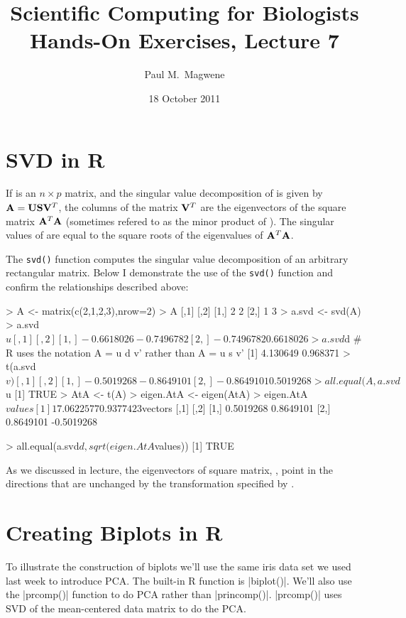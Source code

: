 \documentclass[11pt,letterpaper]{article}
\author{Paul M.~Magwene}
\title{
Scientific Computing for Biologists\\
Hands-On Exercises, Lecture 7}
\date{18 October 2011}
\begin{document}
\maketitle


\section*{ SVD in R}


If  is an $n \times p$ matrix, and the singular value decomposition of  is given by $\mathbf{A} = \mathbf{U} \mathbf{S} \mathbf{V}^T$, the columns of the  matrix $\mathbf{V}^T$ are the eigenvectors of the square matrix $\mathbf{A}^T \mathbf{A}$ (sometimes refered to  as the minor product of ). The singular values of  are equal to the square roots of the eigenvalues of $\mathbf{A}^T \mathbf{A}$. 

The \texttt{svd()} function computes the singular value decomposition of an arbitrary rectangular matrix. Below I demonstrate the use of the \texttt{svd()} function and confirm the relationships described above:


\begin{Rcode}
> A <- matrix(c(2,1,2,3),nrow=2)
> A
     [,1] [,2]
[1,]    2    2
[2,]    1    3
> a.svd <- svd(A)
> a.svd$u
           [,1]       [,2]
[1,] -0.6618026 -0.7496782
[2,] -0.7496782  0.6618026
> a.svd$d	  # R uses the notation A = u d v' rather than A = u s v' 
[1] 4.130649 0.968371
> t(a.svd$v)
           [,1]       [,2]
[1,] -0.5019268 -0.8649101
[2,] -0.8649101  0.5019268
> all.equal(A, a.svd$u %
[1] TRUE
> AtA <- t(A) %
> eigen.AtA <- eigen(AtA)
> eigen.AtA
$values
[1] 17.0622577  0.9377423

$vectors
          [,1]       [,2]
[1,] 0.5019268  0.8649101
[2,] 0.8649101 -0.5019268

> all.equal(a.svd$d, sqrt(eigen.AtA$values))
[1] TRUE
\end{Rcode}

As we discussed in lecture, the eigenvectors of square matrix, , point in the directions that are unchanged by the transformation specified by .



\section*{Creating Biplots in R}

To illustrate the construction of biplots we'll use the same iris data set we used last week to introduce PCA. The built-in R function is |biplot()|. We'll also use the |prcomp()| function to do PCA rather than |princomp()|. |prcomp()| uses SVD of the mean-centered data matrix to do the PCA.
\end{document}
